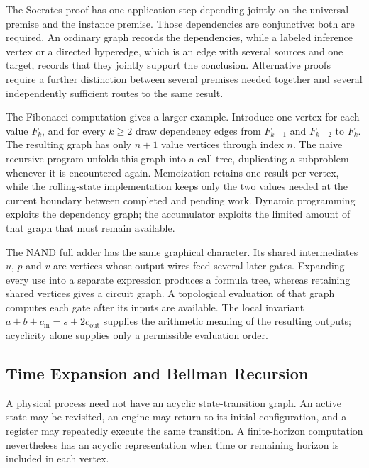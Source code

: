 \documentclass[11pt]{article}
\theoremstyle{definition}
\theoremstyle{remark}
\begin{document}
The Socrates proof has one application step depending jointly on
the universal premise and the instance premise. Those dependencies
are conjunctive: both are required. An ordinary graph records the
dependencies, while a labeled inference vertex or a directed
hyperedge, which is an edge with several sources and one target, records that they jointly support the conclusion.
Alternative proofs require a further distinction between several
premises needed together and several independently sufficient
routes to the same result.

The Fibonacci computation gives a larger example. Introduce one
vertex for each value $F_k$, and for every $k\ge2$ draw dependency
edges from $F_{k-1}$ and $F_{k-2}$ to $F_k$. The resulting graph has
only $n+1$ value vertices through index $n$. The naive recursive
program unfolds this graph into a call tree, duplicating a
subproblem whenever it is encountered again. Memoization retains
one result per vertex, while the rolling-state implementation keeps
only the two values needed at the current boundary between completed
and pending work. Dynamic programming exploits the dependency graph;
the accumulator exploits the limited amount of that graph that must
remain available.

The NAND full adder has the same graphical character. Its shared
intermediates $u$, $p$ and $v$ are vertices whose output wires feed
several later gates. Expanding every use into a separate expression
produces a formula tree, whereas retaining shared vertices gives a
circuit graph. A topological evaluation of that graph computes each
gate after its inputs are available. The local invariant
$a+b+c_{\mathrm{in}}=s+2c_{\mathrm{out}}$ supplies the arithmetic meaning of the resulting
outputs; acyclicity alone supplies only a permissible evaluation
order.

\subsection{Time Expansion and Bellman Recursion}

A physical process need not have an acyclic state-transition graph.
An active state may be revisited, an engine may return to its initial
configuration, and a register may repeatedly execute the same
transition. A finite-horizon computation nevertheless has an
acyclic representation when time or remaining horizon is included
in each vertex.
\end{document}
